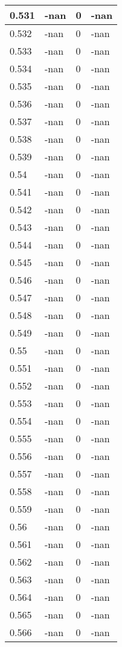 \documentclass[a4paper,14pt]{extarticle}
\begin{document}
\begin{longtable}{||m{3cm}||m{3cm}|m{3cm}||m{3cm}||}
\hline
0.531 & -nan & 0 & -nan\\
\hline
0.532 & -nan & 0 & -nan\\
\hline
0.533 & -nan & 0 & -nan\\
\hline
0.534 & -nan & 0 & -nan\\
\hline
0.535 & -nan & 0 & -nan\\
\hline
0.536 & -nan & 0 & -nan\\
\hline
0.537 & -nan & 0 & -nan\\
\hline
0.538 & -nan & 0 & -nan\\
\hline
0.539 & -nan & 0 & -nan\\
\hline
0.54 & -nan & 0 & -nan\\
\hline
0.541 & -nan & 0 & -nan\\
\hline
0.542 & -nan & 0 & -nan\\
\hline
0.543 & -nan & 0 & -nan\\
\hline
0.544 & -nan & 0 & -nan\\
\hline
0.545 & -nan & 0 & -nan\\
\hline
0.546 & -nan & 0 & -nan\\
\hline
0.547 & -nan & 0 & -nan\\
\hline
0.548 & -nan & 0 & -nan\\
\hline
0.549 & -nan & 0 & -nan\\
\hline
0.55 & -nan & 0 & -nan\\
\hline
0.551 & -nan & 0 & -nan\\
\hline
0.552 & -nan & 0 & -nan\\
\hline
0.553 & -nan & 0 & -nan\\
\hline
0.554 & -nan & 0 & -nan\\
\hline
0.555 & -nan & 0 & -nan\\
\hline
0.556 & -nan & 0 & -nan\\
\hline
0.557 & -nan & 0 & -nan\\
\hline
0.558 & -nan & 0 & -nan\\
\hline
0.559 & -nan & 0 & -nan\\
\hline
0.56 & -nan & 0 & -nan\\
\hline
0.561 & -nan & 0 & -nan\\
\hline
0.562 & -nan & 0 & -nan\\
\hline
0.563 & -nan & 0 & -nan\\
\hline
0.564 & -nan & 0 & -nan\\
\hline
0.565 & -nan & 0 & -nan\\
\hline
0.566 & -nan & 0 & -nan\\

\end{longtable}
\end{document}
